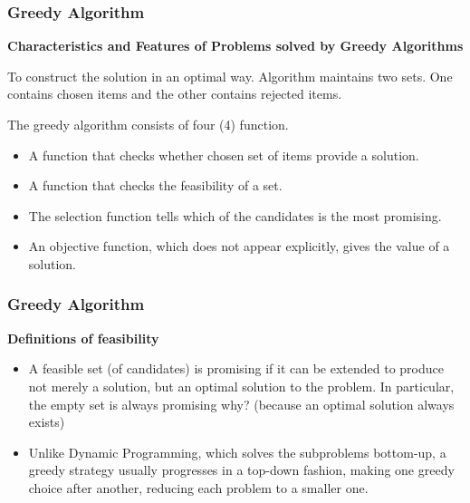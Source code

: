 \documentclass{beamer}
\begin{document}
\begin{frame}
	\frametitle{Greedy Algorithm} 
	
\noindent \textbf{Characteristics and Features of Problems solved by Greedy Algorithms}
	
	
	To construct the solution in an optimal way. Algorithm maintains two sets. One contains chosen items and the other contains rejected items.
	
	The greedy algorithm consists of four (4) function.
	\begin{itemize}
		\item 	A function that checks whether chosen set of items provide a solution.
		\item A function that checks the feasibility of a set.
		\item The selection function tells which of the candidates is the most promising.
		\item An objective function, which does not appear explicitly, gives the value of a solution.
	\end{itemize}

	
\end{frame}
%	
%	
%	
\begin{frame}
	\frametitle{Greedy Algorithm}
	
\textbf{Definitions of feasibility}
	\begin{itemize}
\item A feasible set (of candidates) is promising if it can be extended to produce not merely a solution, but an optimal solution to the problem. In particular, the empty set is always promising why? (because an optimal solution always exists)
	
\item Unlike Dynamic Programming, which solves the subproblems bottom-up, a greedy strategy usually progresses in a top-down fashion, making one greedy choice after another, reducing each problem to a smaller one.
	\end{itemize}
 
\end{frame}
\end{document}
